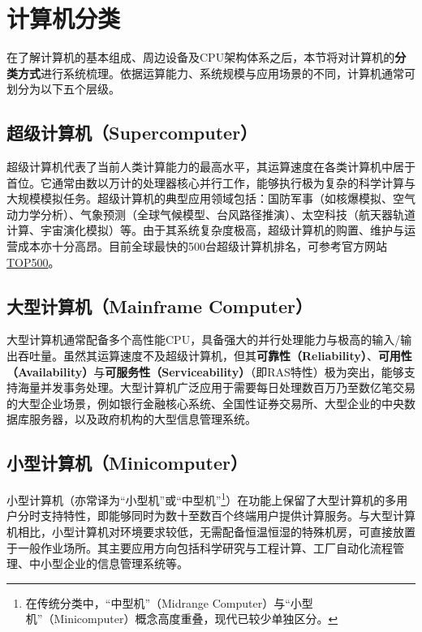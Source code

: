 \documentclass[12pt,UTF8]{ctexbook}
\begin{document}
\section{计算机分类}

在了解计算机的基本组成、周边设备及CPU架构体系之后，本节将对计算机的\textbf{分类方式}进行系统梳理。依据运算能力、系统规模与应用场景的不同，计算机通常可划分为以下五个层级。

\subsection{超级计算机（Supercomputer）}

超级计算机代表了当前人类计算能力的最高水平，其运算速度在各类计算机中居于首位。它通常由数以万计的处理器核心并行工作，能够执行极为复杂的科学计算与大规模模拟任务。超级计算机的典型应用领域包括：国防军事（如核爆模拟、空气动力学分析）、气象预测（全球气候模型、台风路径推演）、太空科技（航天器轨道计算、宇宙演化模拟）等。由于其系统复杂度极高，超级计算机的购置、维护与运营成本亦十分高昂。目前全球最快的500台超级计算机排名，可参考官方网站 \href{http://www.top500.org}{TOP500}。

\subsection{大型计算机（Mainframe Computer）}

大型计算机通常配备多个高性能CPU，具备强大的并行处理能力与极高的输入/输出吞吐量。虽然其运算速度不及超级计算机，但其\textbf{可靠性（Reliability）}、\textbf{可用性（Availability）}与\textbf{可服务性（Serviceability）}（即RAS特性）极为突出，能够支持海量并发事务处理。大型计算机广泛应用于需要每日处理数百万乃至数亿笔交易的大型企业场景，例如银行金融核心系统、全国性证券交易所、大型企业的中央数据库服务器，以及政府机构的大型信息管理系统。

\subsection{小型计算机（Minicomputer）}

小型计算机（亦常译为“小型机”或“中型机”\footnote{在传统分类中，“中型机”（Midrange Computer）与“小型机”（Minicomputer）概念高度重叠，现代已较少单独区分。}）在功能上保留了大型计算机的多用户分时支持特性，即能够同时为数十至数百个终端用户提供计算服务。与大型计算机相比，小型计算机对环境要求较低，无需配备恒温恒湿的特殊机房，可直接放置于一般作业场所。其主要应用方向包括科学研究与工程计算、工厂自动化流程管理、中小型企业的信息管理系统等。
\end{document}
